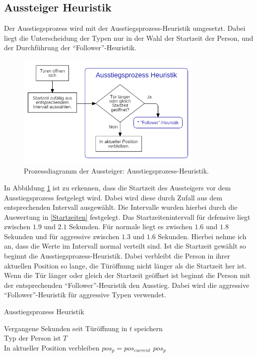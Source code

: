 \subsection{Aussteiger Heuristik} \label{AM}
Der Ausstiegsprozess wird mit der Ausstiegsprozess-Heuristik umgesetzt. Dabei liegt die Unterscheidung der Typen nur in der Wahl der Startzeit der Person, und der Durchführung der "`Follower"'-Heuristik.
\begin{figure}[H]
	\centering
		\includegraphics[width=0.8\textwidth]{pictures/model/algorithm/alight/alight_process.png}
	\caption{Prozessdiagramm der Aussteiger: Ausstiegsprozess-Heuristik.}
	\label{fig:AH}
\end{figure}
In Abbildung \ref{fig:AH} ist zu erkennen, dass die Startzeit des Aussteigers vor dem Ausstiegsprozess festgelegt wird. Dabei wird diese durch Zufall aus dem entsprechenden Intervall ausgewählt. Die Intervalle wurden hierbei durch die Auswertung in \ref{Startzeiten} festgelegt. Das Startzeitenintervall für defensive liegt zwischen $1.9$ und $2.1$ Sekunden. Für normale liegt es zwischen $1.6$ und $1.8$ Sekunden und für aggressive zwischen $1.3$ und $1.6$ Sekunden. Hierbei nehme ich an, dass die Werte im Intervall normal verteilt sind. Ist die Startzeit gewählt so beginnt die Ausstiegsprozess-Heuristik. Dabei verbleibt die Person in ihrer aktuellen Position so lange, die Türöffnung nicht länger als die Startzeit her ist. Wenn die Tür länger oder gleich der Startzeit geöffnet ist beginnt die Person mit der entsprechenden "`Follower"'-Heuristik den Ausstieg. Dabei wird die aggressive "`Follower"'-Heuristik für aggressive Typen verwendet. 

\begin{algorithm} [H]
	\caption{Ausstiegsprozess Heuristik}

	\AlightHeuristic{} {
		Vergangene Sekunden seit Türöffnung in $t$ speichern\\
		Typ der Person ist $T$ \\
		 {
			In aktueller Position verbleiben $pos_{p} = pos_{current}$ 
		} 
		\Return $pos_p$
	}
\end{algorithm}

